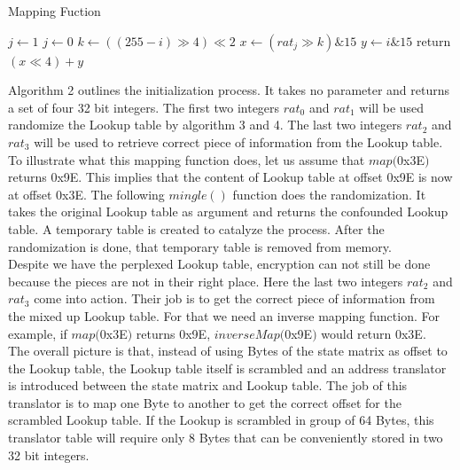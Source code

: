 \begin{algorithm}
	\caption{Mapping Fuction}
	\label{Mapping Function}

	\begin{algorithmic}[1]

	\State $j \gets 1$
		\State $j \gets 0$
	\EndIf
	\State $k \gets ((255-i)\gg 4)\ll 2$
	\State $x \gets (rat_j\gg k)\mathrel{\&} 15$
	\State $y \gets i \mathrel{\&} 15$
	\State return $(x\ll 4)+y$
	\EndFunction

	\end{algorithmic}
\end{algorithm}

Algorithm 2 outlines the initialization process. It takes no parameter and returns a set of four 32 bit integers. The first two integers $rat_0$ and $rat_1$ will be used randomize the Lookup table by algorithm 3 and 4. The last two integers $rat_2$ and $rat_3$ will be used to retrieve correct piece of information from the Lookup table.\\

To illustrate what this mapping function does, let us assume that  $map($0x3E$)$ returns 0x9E. This implies that the content of Lookup table at offset 0x9E is now at offset 0x3E. The following $mingle()$ function does the randomization. It takes the original Lookup table as argument and returns the confounded Lookup table. A temporary table is created to catalyze the process. After the randomization is done, that temporary table is removed from memory.\\

Despite we have the perplexed Lookup table, encryption can not still be done because the pieces are not in their right place. Here the last two integers $rat_2$ and $rat_3$ come into action. Their job is to get the correct piece of information from the mixed up Lookup table. For that we need an inverse mapping function. For example, if $map($0x3E$)$ returns 0x9E, $inverseMap($0x9E$)$ would return 0x3E.\\

The overall picture is that, instead of using Bytes of the state matrix as offset to the Lookup table, the Lookup table itself is scrambled and an address translator is introduced between the state matrix and Lookup table. The job of this translator is to map one Byte to another to get the correct offset for the scrambled Lookup table. If the Lookup is scrambled in group of 64 Bytes, this translator table will require only 8 Bytes that can be conveniently stored in two 32 bit integers.

